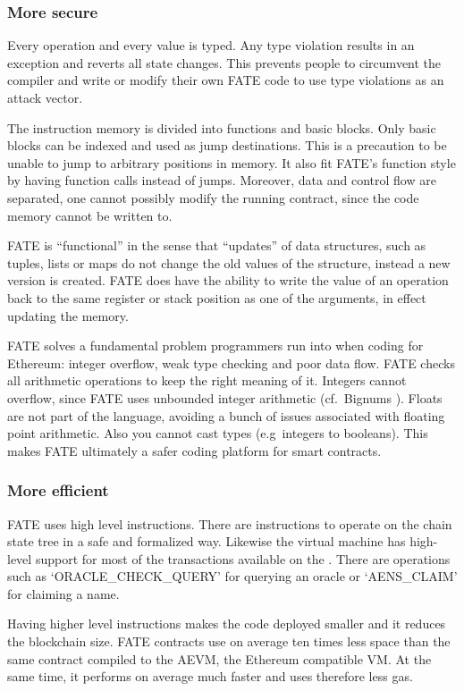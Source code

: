 \subsubsection{More secure}

Every operation and every value is typed. Any type violation results in
an exception and reverts all state changes. This prevents people to
circumvent the compiler and write or modify their own FATE code to use
type violations as an attack vector.

The instruction memory is divided into functions and basic
blocks. Only basic blocks can be indexed and used as jump
destinations. This is a precaution to be unable to jump to arbitrary
positions in memory. It also fit FATE's function style by
having function calls instead of jumps. Moreover, data and control
flow are separated, one cannot possibly modify the running
contract, since the code memory cannot be written to.

FATE is “functional” in the sense that “updates” of data structures,
such as tuples, lists or maps do not change the old values of the
structure, instead a new version is created.  FATE does have the
ability to write the value of an operation back to the same register
or stack position as one of the arguments, in effect updating the
memory.

FATE solves a fundamental problem programmers run into when coding for
Ethereum: integer overflow, weak type checking and poor data
flow. FATE checks all arithmetic operations to keep the right meaning
of it. Integers cannot overflow, since FATE uses unbounded integer
arithmetic (cf.\ Bignums \cite{serpette1989bignum}). Floats are not
part of the language, avoiding a bunch of issues associated with
floating point arithmetic. Also you cannot cast types (e.g\ integers to
booleans). This makes
FATE ultimately a safer coding platform for smart contracts.

\subsubsection{More efficient}

FATE uses high level instructions. There are instructions to operate
on the chain state tree in a safe and formalized way. Likewise the
virtual machine has high-level support for most of the transactions
available on the \blockchain. There are operations such as
`ORACLE\_CHECK\_QUERY' for querying an oracle or `AENS\_CLAIM' for
claiming a name.

Having higher level instructions makes the code
deployed smaller and it reduces the blockchain size. FATE contracts
use on average ten times less space than the same contract compiled to
the AEVM, the Ethereum compatible VM. At the same time, it performs on
average much faster and uses therefore less gas.

